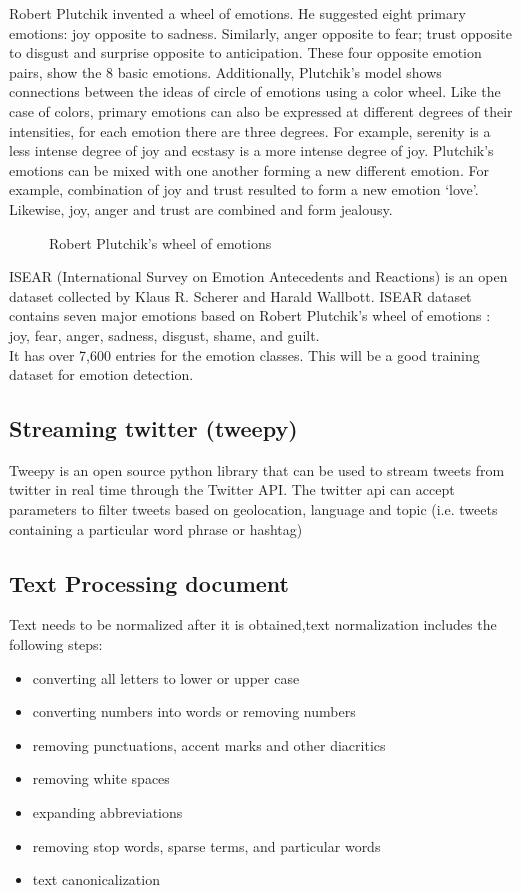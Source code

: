 Robert Plutchik invented a wheel of emotions. He suggested eight primary emotions: joy opposite to sadness. Similarly, anger opposite to fear; trust opposite to disgust and surprise opposite to anticipation. These four opposite emotion pairs, show the 8 basic emotions. Additionally, Plutchik’s model shows connections between the ideas of circle of emotions using a color wheel. Like the case of colors, primary emotions can also be expressed at different degrees of their intensities, for each emotion there are three degrees. For example, serenity is a less intense degree of joy
and ecstasy is a more intense degree of joy. Plutchik’s emotions can be mixed with one another
forming a new different emotion. For example, combination of joy and trust resulted to form a new
emotion ‘love’. Likewise, joy, anger and trust are combined and form jealousy\cite{ref:4}.

\begin{figure}[h]
  \centering
  \caption[Robert Plutchik's wheel of emotions]%
  {Robert Plutchik's wheel of emotions}
  \label{fig:ALAP:sm3}
\end{figure}


ISEAR (International Survey on Emotion Antecedents and Reactions) is an open dataset collected by Klaus R. Scherer and Harald Wallbott. 
ISEAR dataset contains seven major emotions based on Robert Plutchik's wheel of emotions : joy, fear, anger, sadness, disgust, shame, and guilt.\\
It has over 7,600 entries for the emotion classes. This will be a good training dataset for emotion detection.
\clearpage

\subsection{Streaming twitter (tweepy)}
Tweepy is an open source python library that can be used to stream tweets from twitter in real time through the Twitter API. The twitter api can accept parameters to filter tweets based on geolocation, language and topic (i.e. tweets containing a particular word phrase or hashtag)


\subsection{Text Processing document}
Text needs to be normalized after it is obtained,text normalization includes the following steps:
\begin{itemize}
\item converting all letters to lower or upper case
\item converting numbers into words or removing numbers
\item removing punctuations, accent marks and other diacritics
\item removing white spaces
\item expanding abbreviations
\item removing stop words, sparse terms, and particular words
\item text canonicalization
\end{itemize}

